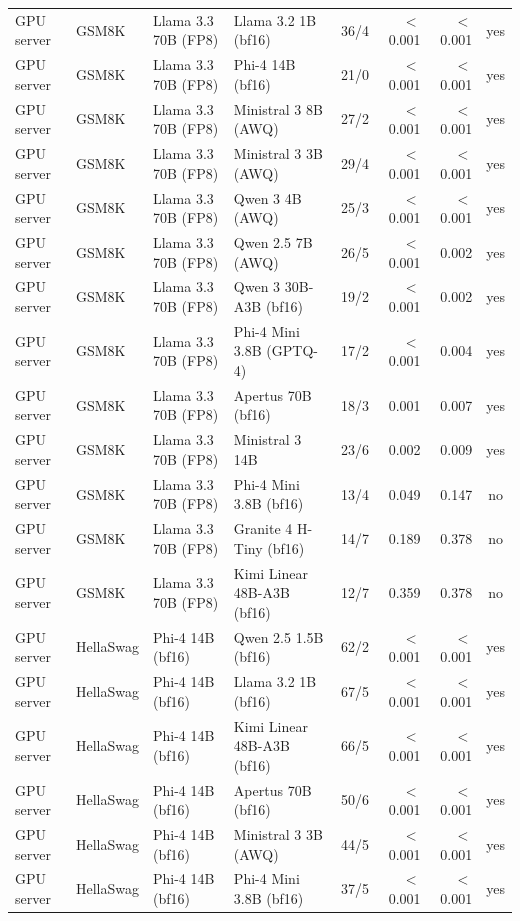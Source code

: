 \begin{longtable}{@{}l l l l r r r c@{}}
GPU server & GSM8K & Llama 3.3 70B (FP8) & Llama 3.2 1B (bf16) & 36/4 & $<$0.001 & $<$0.001 & yes \\
GPU server & GSM8K & Llama 3.3 70B (FP8) & Phi-4 14B (bf16) & 21/0 & $<$0.001 & $<$0.001 & yes \\
GPU server & GSM8K & Llama 3.3 70B (FP8) & Ministral 3 8B (AWQ) & 27/2 & $<$0.001 & $<$0.001 & yes \\
GPU server & GSM8K & Llama 3.3 70B (FP8) & Ministral 3 3B (AWQ) & 29/4 & $<$0.001 & $<$0.001 & yes \\
GPU server & GSM8K & Llama 3.3 70B (FP8) & Qwen 3 4B (AWQ) & 25/3 & $<$0.001 & $<$0.001 & yes \\
GPU server & GSM8K & Llama 3.3 70B (FP8) & Qwen 2.5 7B (AWQ) & 26/5 & $<$0.001 & 0.002 & yes \\
GPU server & GSM8K & Llama 3.3 70B (FP8) & Qwen 3 30B-A3B (bf16) & 19/2 & $<$0.001 & 0.002 & yes \\
GPU server & GSM8K & Llama 3.3 70B (FP8) & Phi-4 Mini 3.8B (GPTQ-4) & 17/2 & $<$0.001 & 0.004 & yes \\
GPU server & GSM8K & Llama 3.3 70B (FP8) & Apertus 70B (bf16) & 18/3 & 0.001 & 0.007 & yes \\
GPU server & GSM8K & Llama 3.3 70B (FP8) & Ministral 3 14B & 23/6 & 0.002 & 0.009 & yes \\
GPU server & GSM8K & Llama 3.3 70B (FP8) & Phi-4 Mini 3.8B (bf16) & 13/4 & 0.049 & 0.147 & no \\
GPU server & GSM8K & Llama 3.3 70B (FP8) & Granite 4 H-Tiny (bf16) & 14/7 & 0.189 & 0.378 & no \\
GPU server & GSM8K & Llama 3.3 70B (FP8) & Kimi Linear 48B-A3B (bf16) & 12/7 & 0.359 & 0.378 & no \\
\midrule
GPU server & HellaSwag & Phi-4 14B (bf16) & Qwen 2.5 1.5B (bf16) & 62/2 & $<$0.001 & $<$0.001 & yes \\
GPU server & HellaSwag & Phi-4 14B (bf16) & Llama 3.2 1B (bf16) & 67/5 & $<$0.001 & $<$0.001 & yes \\
GPU server & HellaSwag & Phi-4 14B (bf16) & Kimi Linear 48B-A3B (bf16) & 66/5 & $<$0.001 & $<$0.001 & yes \\
GPU server & HellaSwag & Phi-4 14B (bf16) & Apertus 70B (bf16) & 50/6 & $<$0.001 & $<$0.001 & yes \\
GPU server & HellaSwag & Phi-4 14B (bf16) & Ministral 3 3B (AWQ) & 44/5 & $<$0.001 & $<$0.001 & yes \\
GPU server & HellaSwag & Phi-4 14B (bf16) & Phi-4 Mini 3.8B (bf16) & 37/5 & $<$0.001 & $<$0.001 & yes \\

\end{longtable}
